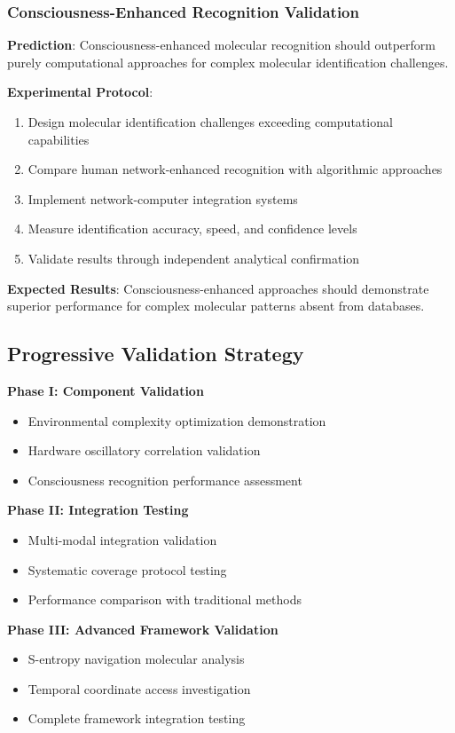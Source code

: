\documentclass[11pt,a4paper]{article}
\theoremstyle{remark}
\begin{document}
\subsubsection{Consciousness-Enhanced Recognition Validation}

\textbf{Prediction}: Consciousness-enhanced molecular recognition should outperform purely computational approaches for complex molecular identification challenges.

\textbf{Experimental Protocol}:
\begin{enumerate}
\item Design molecular identification challenges exceeding computational capabilities
\item Compare human network-enhanced recognition with algorithmic approaches
\item Implement network-computer integration systems
\item Measure identification accuracy, speed, and confidence levels
\item Validate results through independent analytical confirmation
\end{enumerate}

\textbf{Expected Results}: Consciousness-enhanced approaches should demonstrate superior performance for complex molecular patterns absent from databases.

\subsection{Progressive Validation Strategy}

\textbf{Phase I: Component Validation}
\begin{itemize}
\item Environmental complexity optimization demonstration
\item Hardware oscillatory correlation validation
\item Consciousness recognition performance assessment
\end{itemize}

\textbf{Phase II: Integration Testing}
\begin{itemize}
\item Multi-modal integration validation
\item Systematic coverage protocol testing
\item Performance comparison with traditional methods
\end{itemize}

\textbf{Phase III: Advanced Framework Validation}
\begin{itemize}
\item S-entropy navigation molecular analysis
\item Temporal coordinate access investigation
\item Complete framework integration testing
\end{itemize}
\end{document}
